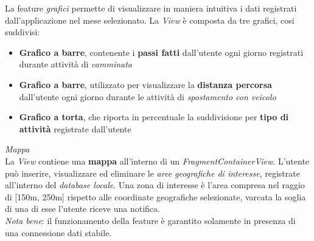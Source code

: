 \documentclass{article}
\begin{document}
La feature \textit{grafici} permette di visualizzare in maniera intuitiva i dati registrati dall'applicazione nel mese selezionato. La \textit{View} è composta da tre grafici, cosi suddivisi:
\begin{itemize}
    \renewcommand{\labelitemi}{-}
    \item \textbf{Grafico a barre}, contenente i \textbf{passi fatti} dall'utente ogni giorno registrati durante attività di \textit{camminata}
    \item \textbf{Grafico a barre}, utilizzato per visualizzare la \textbf{distanza percorsa} dall'utente ogni giorno durante le attività di \textit{spostamento con veicolo}
    \item \textbf{Grafico a torta}, che riporta in percentuale la suddivisione per \textbf{tipo di attività} registrate dall'utente
\end{itemize}
\textit{Mappa} \vspace*{7pt}\\
La \textit{View} contiene una \textbf{mappa} all'interno di un \textit{FragmentContainerView}. L'utente può inserire, visualizzare ed eliminare le \textit{aree geografiche di interesse}, registrate all'interno del \textit{database locale}. Una zona di interesse è l'area compresa nel raggio di [150m, 250m] rispetto alle coordinate geografiche selezionate, varcata la soglia di una di esse l'utente riceve una notifica. \vspace*{7pt}\\
\textit{Nota bene}: il funzionamento della feature è garantito solamente in presenza di una connessione dati stabile.
\end{document}
